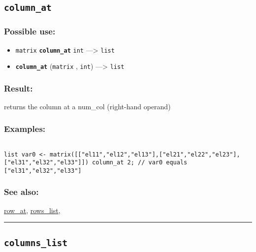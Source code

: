 \documentclass[]{book}
\providecommand{\tightlist}{%
  \setlength{\itemsep}{0pt}\setlength{\parskip}{0pt}}
\theoremstyle{definition}
\theoremstyle{definition}
\theoremstyle{definition}
\theoremstyle{remark}
\begin{document}
\subsection{\texorpdfstring{\texttt{column\_at}}{column\_at}}\label{column_at}

\subsubsection{Possible use:}\label{possible-use-91}

\begin{itemize}
\tightlist
\item
  \texttt{matrix} \textbf{\texttt{column\_at}} \texttt{int}
  ---\textgreater{} \texttt{list}
\item
  \textbf{\texttt{column\_at}} (\texttt{matrix} , \texttt{int})
  ---\textgreater{} \texttt{list}
\end{itemize}

\subsubsection{Result:}\label{result-89}

returns the column at a num\_col (right-hand operand)

\subsubsection{Examples:}\label{examples-70}

\begin{verbatim}
 
list var0 <- matrix([["el11","el12","el13"],["el21","el22","el23"],["el31","el32","el33"]]) column_at 2; // var0 equals ["el31","el32","el33"]
\end{verbatim}

\subsubsection{See also:}\label{see-also-56}

\href{OperatorsNR\#row_at}{row\_at},
\href{OperatorsNR\#rows_list}{rows\_list},

\begin{center}\rule{0.5\linewidth}{\linethickness}\end{center}

\subsection{\texorpdfstring{\texttt{columns\_list}}{columns\_list}}\label{columns_list}
\end{document}
